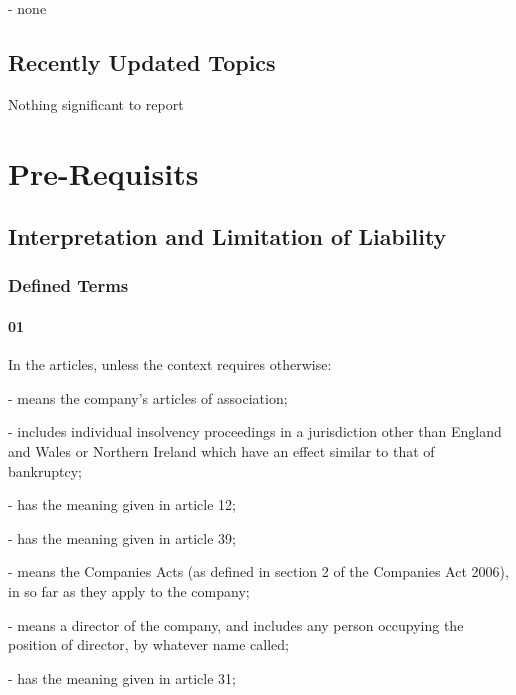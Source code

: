 \documentclass[letterpaper,10pt,english]{sphinxmanual}
\begin{document}
 - none


\section{Recently Updated Topics}
\label{\detokenize{releasenotes:recently-updated-topics}}
Nothing significant to report


\chapter{Pre-Requisits}
\label{\detokenize{content:pre-requisits}}\label{\detokenize{content::doc}}

\section{Interpretation and Limitation of Liability}
\label{\detokenize{content:interpretation-and-limitation-of-liability}}

\subsection{Defined Terms}
\label{\detokenize{content:defined-terms}}

\subsubsection{01}
\label{\detokenize{content:id1}}
In the articles, unless the context requires otherwise:

 - means the company’s articles of association;

 - includes individual insolvency proceedings in a jurisdiction other than England and Wales or Northern Ireland which have an effect similar to that of bankruptcy;

 - has the meaning given in article 12;

 - has the meaning given in article 39;

 - means the Companies Acts (as defined in section 2 of the Companies Act 2006), in so far as they apply to the company;

 - means a director of the company, and includes any person occupying the position of director, by whatever name called;

 - has the meaning given in article 31;
\end{document}
